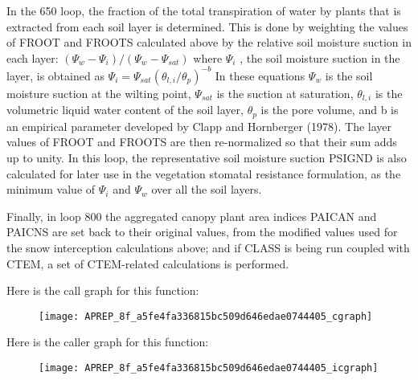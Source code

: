 In the 650 loop, the fraction of the total transpiration of water by plants that is extracted from each soil layer is determined. This is done by weighting the values of F\+R\+O\+O\+T and F\+R\+O\+O\+T\+S calculated above by the relative soil moisture suction in each layer\+: $( \Psi_w - \Psi_i )/( \Psi_w - \Psi_{sat} )$ where $\Psi_i$ , the soil moisture suction in the layer, is obtained as $\Psi_i = \Psi_{sat} ( \theta_{l,i} / \theta_p )^{-b}$ In these equations $\Psi_w$ is the soil moisture suction at the wilting point, $\Psi_{sat}$ is the suction at saturation, $\theta_{l,i}$ is the volumetric liquid water content of the soil layer, $\theta_p$ is the pore volume, and b is an empirical parameter developed by Clapp and Hornberger (1978). The layer values of F\+R\+O\+O\+T and F\+R\+O\+O\+T\+S are then re-\/normalized so that their sum adds up to unity. In this loop, the representative soil moisture suction P\+S\+I\+G\+N\+D is also calculated for later use in the vegetation stomatal resistance formulation, as the minimum value of $\Psi_i$ and $\Psi_w$ over all the soil layers.

Finally, in loop 800 the aggregated canopy plant area indices P\+A\+I\+C\+A\+N and P\+A\+I\+C\+N\+S are set back to their original values, from the modified values used for the snow interception calculations above; and if C\+L\+A\+S\+S is being run coupled with C\+T\+E\+M, a set of C\+T\+E\+M-\/related calculations is performed.

Here is the call graph for this function\+:\nopagebreak
\begin{figure}[H]
\begin{center}
\leavevmode
\texttt{[image: APREP\_8f\_a5fe4fa336815bc509d646edae0744405\_cgraph]}
\end{center}
\end{figure}




Here is the caller graph for this function\+:\nopagebreak
\begin{figure}[H]
\begin{center}
\leavevmode
\texttt{[image: APREP\_8f\_a5fe4fa336815bc509d646edae0744405\_icgraph]}
\end{center}
\end{figure}



